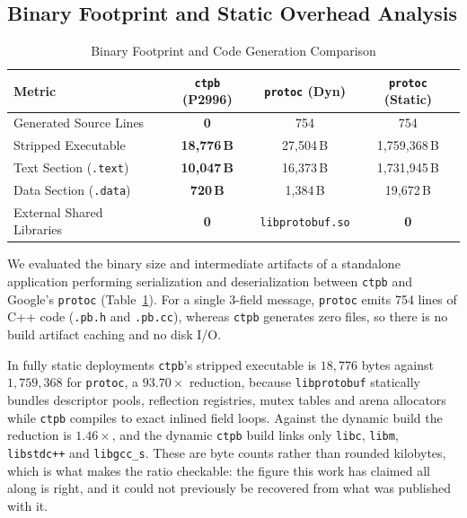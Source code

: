 \subsection{Binary Footprint and Static Overhead Analysis}
\begin{table}[ht]
\centering
\caption{Binary Footprint and Code Generation Comparison}
\label{tab:binary_footprint}
\renewcommand{\arraystretch}{1.15}
\setlength{\tabcolsep}{3pt}
\scriptsize
\begin{tabular}{|l|c|c|c|}
\hline
\textbf{Metric} & \textbf{\texttt{ctpb} (P2996)} & \textbf{\texttt{protoc} (Dyn)} & \textbf{\texttt{protoc} (Static)} \\ \hline
Generated Source Lines & \textbf{0} & 754 & 754 \\ \hline
Stripped Executable & \textbf{18{,}776\,B} & 27{,}504\,B & 1{,}759{,}368\,B \\ \hline
Text Section (\texttt{.text}) & \textbf{10{,}047\,B} & 16{,}373\,B & 1{,}731{,}945\,B \\ \hline
Data Section (\texttt{.data}) & \textbf{720\,B} & 1{,}384\,B & 19{,}672\,B \\ \hline
External Shared Libraries & \textbf{0} & \texttt{libprotobuf.so} & \textbf{0} \\ \hline
\end{tabular}
\end{table}

We evaluated the binary size and intermediate artifacts of a standalone application performing serialization and deserialization between \texttt{ctpb} and Google's \texttt{protoc} (Table~\ref{tab:binary_footprint}). For a single 3-field message, \texttt{protoc} emits 754 lines of C++ code (\texttt{.pb.h} and \texttt{.pb.cc}), whereas \texttt{ctpb} generates zero files, so there is no build artifact caching and no disk I/O.

In fully static deployments \texttt{ctpb}'s stripped executable is $18{,}776$ bytes against $1{,}759{,}368$ for \texttt{protoc}, a $\mathbf{93.70\times}$ reduction, because \texttt{libprotobuf} statically bundles descriptor pools, reflection registries, mutex tables and arena allocators while \texttt{ctpb} compiles to exact inlined field loops. Against the dynamic build the reduction is $1.46\times$, and the dynamic \texttt{ctpb} build links only \texttt{libc}, \texttt{libm}, \texttt{libstdc++} and \texttt{libgcc\_s}. These are byte counts rather than rounded kilobytes, which is what makes the ratio checkable: the figure this work has claimed all along is right, and it could not previously be recovered from what was published with it.

